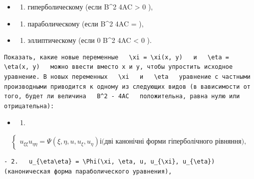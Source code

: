 \documentclass[
  ukrainian,
]{article}
\providecommand{\tightlist}{%
  \setlength{\itemsep}{0pt}\setlength{\parskip}{0pt}}
\begin{document}
\begin{itemize}
\tightlist
\item
  \begin{enumerate}
  \def\labelenumi{\arabic{enumi})}
  \tightlist
  \item
    гиперболическому (если B\^{}2 4AC \textgreater{} 0 ),
  \end{enumerate}
\item
  \begin{enumerate}
  \def\labelenumi{\arabic{enumi})}
  \setcounter{enumi}{1}
  \tightlist
  \item
    параболическому (если B\^{}2 4AC = ),
  \end{enumerate}
\item
  \begin{enumerate}
  \def\labelenumi{\arabic{enumi})}
  \setcounter{enumi}{2}
  \tightlist
  \item
    эллиптическому (если 0 B\^{}2 4AC \textless{} 0 ).
  \end{enumerate}
\end{itemize}

\begin{verbatim}
Показать, какие новые переменные   \xi = \xi(x, y)   и   \eta = \eta(x, y)   можно ввести вместо x и y, чтобы упростить исходное уравнение. В новых переменных   \xi   и   \eta   уравнение с частными производными приводится к одному из следующих видов (в вависимости от того, будет ли величина   B^2 - 4AC   положительна, равна нулю или отрицательна):
\end{verbatim}

\begin{itemize}
\tightlist
\item
  \begin{enumerate}
  \def\labelenumi{\arabic{enumi}.}
  \tightlist
  \item
  \end{enumerate}
\end{itemize}

\[
\begin{cases} u_{\xi\xi} u_{\eta\eta} = \Psi(\xi,  \eta, u, u_{\xi}, u_{\eta}) і \text{(дві канонічні форми гіперболічного рівняння),} \end{cases}
\]

\begin{verbatim}
- 2.   u_{\eta\eta} = \Phi(\xi, \eta, u, u_{\xi}, u_{\eta})   (каноническая форма параболического уравнения),
\end{verbatim}
\end{document}

